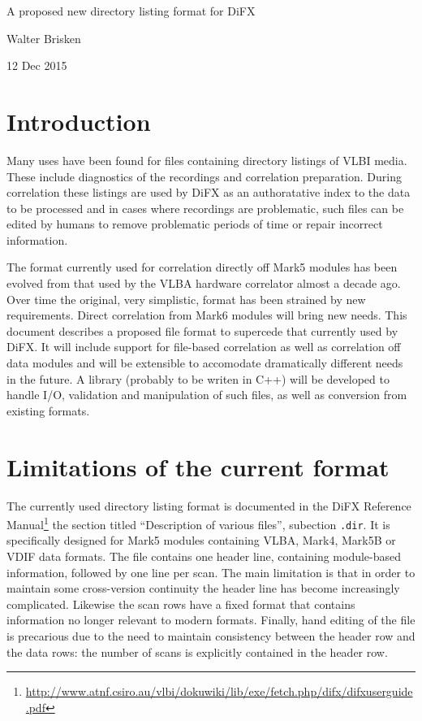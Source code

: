 \documentclass[12pt]{article}
\begin{document}
\begin{center}

\vspace{10pt}
{\Large A proposed new directory listing format for DiFX}

\vspace{15pt}
Walter Brisken

\vspace{5pt}
12 Dec 2015
\end{center}

\section{Introduction}

Many uses have been found for files containing directory listings of VLBI media.
These include diagnostics of the recordings and correlation preparation.
During correlation these listings are used by DiFX as an authoratative index to the data to be processed and in cases where recordings are problematic, such files can be edited by humans to remove problematic periods of time or repair incorrect information.

The format currently used for correlation directly off Mark5 modules has been evolved from that used by the VLBA hardware correlator almost a decade ago.
Over time the original, very simplistic, format has been strained by new requirements.
Direct correlation from Mark6 modules will bring new needs.
This document describes a proposed file format to supercede that currently used by DiFX.
It will include support for file-based correlation as well as correlation off data modules and will be extensible to accomodate dramatically different needs in the future.
A library (probably to be writen in C++) will be developed to handle I/O, validation and manipulation of such files, as well as conversion from existing formats.

\section{Limitations of the current format}

The currently used directory listing format is documented in the DiFX Reference Manual\footnote{\url{http://www.atnf.csiro.au/vlbi/dokuwiki/lib/exe/fetch.php/difx/difxuserguide.pdf}} the section titled ``Description of various files'', subection {\tt .dir}.
It is specifically designed for Mark5 modules containing VLBA, Mark4, Mark5B or VDIF data formats.
The file contains one header line, containing module-based information, followed by one line per scan.
The main limitation is that in order to maintain some cross-version continuity the header line has become increasingly complicated.
Likewise the scan rows have a fixed format that contains information no longer relevant to modern formats.
Finally, hand editing of the file is precarious due to the need to maintain consistency between the header row and the data rows: the number of scans is explicitly contained in the header row.
\end{document}

